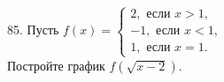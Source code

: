 85. Пусть $f(x)=\begin{cases} 2, \text{ если } x>1,\\ -1, \text{ если } x<1,\\ 1, \text{ если } x=1.\end{cases}$\\
Постройте график $f(\sqrt{x-2}).$\\
